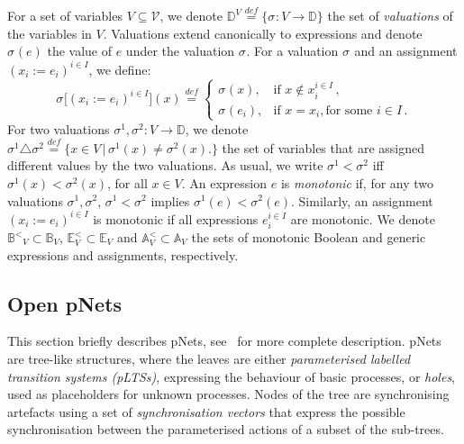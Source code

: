 \documentclass{llncs}
\newcommand{\Ludo}{\\\hfill\mdash Ludo}
\newcommand{\noteLH}[2][color=orange!40, size=\tiny]{\todo[#1]{{#2}\Ludo}}
\newcommand{\add}[2][Added]{\todo[color=blue!20, size=\tiny]{#1}{\color{blue}#2}}
\newcommand{\addSB}[1]{\add[Added by Simon]{#1}}
\newcommand{\sA}{\ensuremath{\mathbb{A}}}
\newcommand{\sB}{\ensuremath{\mathbb{B}}}
\newcommand{\sD}{\ensuremath{\mathbb{D}}}
\newcommand{\sE}{\ensuremath{\mathbb{E}}}
\newcommand{\cV}{\ensuremath{\mathcal{V}}}
\newcommand{\mdash}[1][]{---#1}
\newcommand{\bydef}[1]{\ensuremath{\stackrel{\mathit{\scriptscriptstyle def}}{#1}}}
\newcommand{\bsetdef}[2]{\ensuremath{\bigl\{{#1}\,\bigl|\,{#2}\bigr.\bigr\}}}
\newcommand{\order}{<}
\newcommand{\ordbool}{\ensuremath{\sB^{\order}}}
\newcommand{\data}{\ensuremath{\sD}}
\newcommand{\variables}{\ensuremath{\cV}}
\newcommand{\exprs}[1]{\ensuremath{\sE_{#1}}}
\newcommand{\monexprs}[1]{\ensuremath{\sE^{\order}_{#1}}}
\newcommand{\boolexprs}[1]{\ensuremath{\sB_{#1}}}
\newcommand{\guards}[1]{\ensuremath{\ordbool_{#1}}}
\newcommand{\assigns}[1]{\ensuremath{\sA_{#1}}}
\newcommand{\updates}[1]{\ensuremath{\sA^{\order}_{#1}}}
\newcommand{\valuations}[1]{\ensuremath{\data^{#1}}}
\newcommand{\val}[3][]{\ensuremath{#1{\sigma}^{#2}_{#3}}}
\newcommand{\valdiff}[2]{\ensuremath{#1 \triangle #2}}
\begin{document}
For a set of variables $V \subseteq \variables$, we denote
$\valuations{V} \bydef{=} \{\val{}{}: V \rightarrow \data\}$
the set of \emph{valuations} of the variables in $V$.
Valuations extend canonically to expressions and denote $\val{}{}(e)$ the value of $e$ under the valuation $\val{}{}$.
For a valuation $\val{}{}$ and an assignment $(x_i := e_i)^{i \in I}$, we define:
\[
\val{}{}\bigl[(x_i := e_i)^{i \in I}\bigr](x) \bydef{=}
\begin{cases}
  \val{}{}(x), & \text{if } x \not\in x_i^{i \in I}\,,\\
  \val{}{}(e_i), & \text{if } x = x_i, \text{for some } i \in I\,.
\end{cases}
\]
For two valuations $\val{1}{}, \val{2}{} : V \rightarrow
\data$, we denote $\valdiff{\val{1}{}}{\val{2}{}} \bydef{=}
\bsetdef{x \in V}{\val{1}{}(x) \neq \val{2}{}(x)}$ the set of
variables that are assigned different values by the two
valuations.  As usual, we write $\val{1}{} \order \val{2}{}$
iff $\val{1}{}(x) \order \val{2}{}(x)$, for all $x \in V$.  An
expression $e$ is  \emph{monotonic} if, for
any two valuations $\val{1}{}, \val{2}{}$,
$\val{1}{} \order \val{2}{}$ implies $\val{1}{}(e) \order
\val{2}{}(e)$.
%
Similarly, an assignment $(x_i := e_i)^{i \in I} $ is
 monotonic if all expressions $e_i^{i \in I}$ are monotonic.
We  denote $\guards{V} \subset \boolexprs{V}$, $\monexprs{V}
\subset \exprs{V}$ and $\updates{V} \subset \assigns{V}$ the sets of
monotonic Boolean and generic expressions and assignments,
respectively.
%

\subsection{Open pNets}
\label{secn:pNets}
This section briefly describes pNets, see~\cite{HMZ-FORTE2016} for more complete   description.
pNets are tree-like structures, where the leaves are either
\emph{parameterised labelled transition systems (pLTSs)}, expressing the
behaviour of basic processes, or \emph{holes}, used as placeholders
for unknown processes.
Nodes of the tree are synchronising artefacts using a
set of \emph{synchronisation vectors} that express the possible
synchronisation between the parameterised actions of a subset of the
sub-trees.
\end{document}
